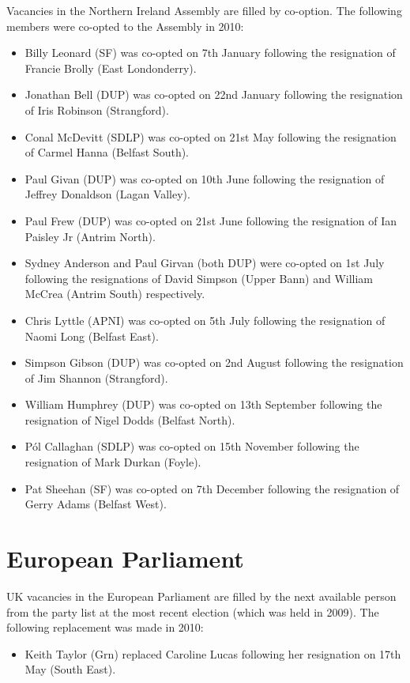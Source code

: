 Vacancies in the Northern Ireland Assembly are filled by co-option.  The following members were co-opted to the Assembly in 2010:
\begin{itemize}
\item Billy Leonard (SF) was co-opted on 7th January following the resignation of Francie Brolly (East Londonderry).
\item Jonathan Bell (DUP) was co-opted on 22nd January following the resignation of Iris Robinson (Strangford).
\item Conal McDevitt (SDLP) was co-opted on 21st May following the resignation of Carmel Hanna (Belfast South).
\item Paul Givan (DUP) was co-opted on 10th June following the resignation of Jeffrey Donaldson (Lagan Valley).
\item Paul Frew (DUP) was co-opted on 21st June following the resignation of Ian Paisley Jr (Antrim North).
\item Sydney Anderson and Paul Girvan (both DUP) were co-opted on 1st July following the resignations of David Simpson (Upper Bann) and William McCrea (Antrim South) respectively.
\item Chris Lyttle (APNI) was co-opted on 5th July following the resignation of Naomi Long (Belfast East).
\item Simpson Gibson (DUP) was co-opted on 2nd August following the resignation of Jim Shannon (Strangford).
\item William Humphrey (DUP) was co-opted on 13th September following the resignation of Nigel Dodds (Belfast North).
\item P\'ol Callaghan (SDLP) was co-opted on 15th November following the resignation of Mark Durkan (Foyle).
\item Pat Sheehan (SF) was co-opted on 7th December following the resignation of Gerry Adams (Belfast West).
\end{itemize}

\section{European Parliament}

UK vacancies in the European Parliament are filled by the next available person from the party list at the most recent election (which was held in 2009).  The following replacement was made in 2010:
\begin{itemize}
\item Keith Taylor (Grn) replaced Caroline Lucas following her resignation on 17th May (South East).
\end{itemize}

